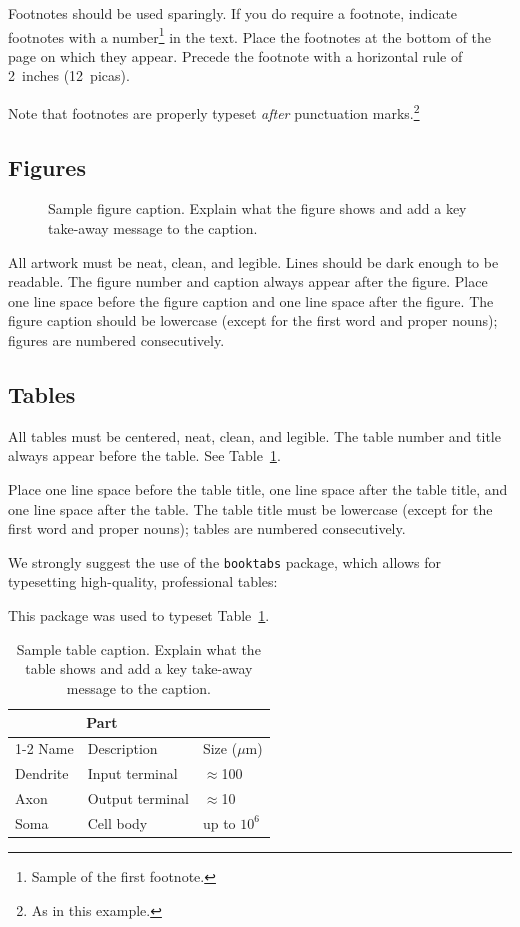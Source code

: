\documentclass{article}
\begin{document}
Footnotes should be used sparingly.  If you do require a footnote, indicate
footnotes with a number\footnote{Sample of the first footnote.} in the
text. Place the footnotes at the bottom of the page on which they appear.
Precede the footnote with a horizontal rule of 2~inches (12~picas).


Note that footnotes are properly typeset \emph{after} punctuation
marks.\footnote{As in this example.}


\subsection{Figures}


\begin{figure}
  \centering
  \fbox{\rule[-.5cm]{0cm}{4cm} \rule[-.5cm]{4cm}{0cm}}
  \caption{Sample figure caption. Explain what the figure shows and add a key take-away message to the caption.}
\end{figure}


All artwork must be neat, clean, and legible. Lines should be dark enough to be readable. The figure number and caption always appear after the
figure. Place one line space before the figure caption and one line space after
the figure. The figure caption should be lowercase (except for the first word and proper nouns); figures are numbered consecutively.


\subsection{Tables}


All tables must be centered, neat, clean, and legible.  The table number and
title always appear before the table.  See Table~\ref{sample-table}.


Place one line space before the table title, one line space after the
table title, and one line space after the table. The table title must
be lowercase (except for the first word and proper nouns); tables are
numbered consecutively.

We strongly suggest the use of the \verb+booktabs+ package, which allows for
typesetting high-quality, professional tables:

This package was used to typeset Table~\ref{sample-table}.


\begin{table}
  \caption{Sample table caption. Explain what the table shows and add a key take-away message to the caption.}
  \label{sample-table}
  \centering
  \begin{tabular}{lll}
    \toprule
    \multicolumn{2}{c}{Part}                   \\
    \cmidrule(r){1-2}
    Name     & Description     & Size ($\mu$m) \\
    \midrule
    Dendrite & Input terminal  & $\approx$100     \\
    Axon     & Output terminal & $\approx$10      \\
    Soma     & Cell body       & up to $10^6$  \\
    \bottomrule
  \end{tabular}
\end{table}
\end{document}
